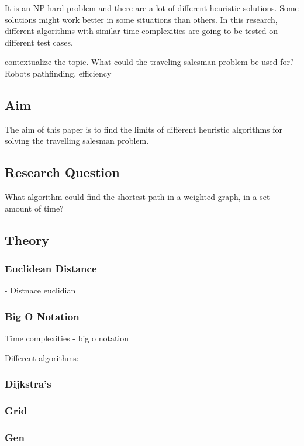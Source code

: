 \documentclass{article}
\begin{document}
It is an NP-hard problem and there are a lot of different heuristic solutions. Some solutions might work better in some situations than others. In this research, different algorithms with similar time complexities are going to be tested on different test cases. 

contextualize the topic. What could the traveling salesman problem be used for? - Robots pathfinding, efficiency


\subsection{Aim}\label{Aim}
The aim of this paper is to find the limits of different heuristic algorithms for solving the travelling salesman problem. 

\subsection{Research Question}\label{RQ}
What algorithm could find the shortest path in a weighted graph, in a set amount of time?



\subsection{Theory}\label{Theory}
\subsubsection{Euclidean Distance}\label{Euclidean Distance}
- Distnace euclidian

\subsubsection{Big O Notation}\label{Big O}
Time complexities - big o notation




Different algorithms:

\subsubsection{Dijkstra's}\label{subsubsec1}

\subsubsection{Grid}\label{subsubsec2}

\subsubsection{Gen}\label{subsubsec3}
\end{document}
